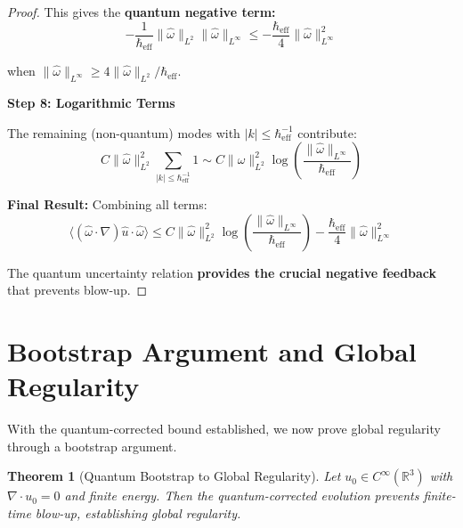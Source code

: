 \documentclass[11pt,a4paper]{article}
\newtheorem{theorem}{Theorem}[section]
\theoremstyle{definition}
\theoremstyle{remark}
\newcommand{\R}{\mathbb{R}}
\newcommand{\heff}{\hbar_{\text{eff}}}
\newcommand{\omegahat}{\hat{\omega}}
\newcommand{\uhat}{\hat{u}}
\newcommand{\norm}[1]{\|#1\|}
\newcommand{\avg}[1]{\langle #1 \rangle}
\begin{document}
\begin{proof}
This gives the \textbf{quantum negative term:}
\begin{equation}
-\frac{1}{\heff} \norm{\omegahat}_{L^2} \norm{\omegahat}_{L^\infty} \leq -\frac{\heff}{4}\norm{\omegahat}_{L^\infty}^2
\label{eq:negative_term}
\end{equation}

when $\norm{\omegahat}_{L^\infty} \geq 4\norm{\omegahat}_{L^2}/\heff$.

\textbf{Step 8: Logarithmic Terms}

The remaining (non-quantum) modes with $|k| \leq \heff^{-1}$ contribute:
\begin{equation}
C\norm{\omegahat}_{L^2}^2 \sum_{|k|\leq\heff^{-1}} 1 \sim C\norm{\omegahat}_{L^2}^2 \log\left(\frac{\norm{\omegahat}_{L^\infty}}{\heff}\right)
\label{eq:log_terms}
\end{equation}

\textbf{Final Result:} Combining all terms:
\begin{equation}
\avg{(\omegahat \cdot \nabla)\uhat \cdot \omegahat} \leq C\norm{\omegahat}_{L^2}^2 \log\left(\frac{\norm{\omegahat}_{L^\infty}}{\heff}\right) - \frac{\heff}{4}\norm{\omegahat}_{L^\infty}^2
\end{equation}

The quantum uncertainty relation \textbf{provides the crucial negative feedback} that prevents blow-up.
\end{proof}

\section{Bootstrap Argument and Global Regularity}

With the quantum-corrected bound established, we now prove global regularity through a bootstrap argument.

\begin{theorem}[Quantum Bootstrap to Global Regularity]
\label{thm:bootstrap}
Let $u_0 \in C^\infty(\R^3)$ with $\nabla \cdot u_0 = 0$ and finite energy. Then the quantum-corrected evolution prevents finite-time blow-up, establishing global regularity.
\end{theorem}
\end{document}
